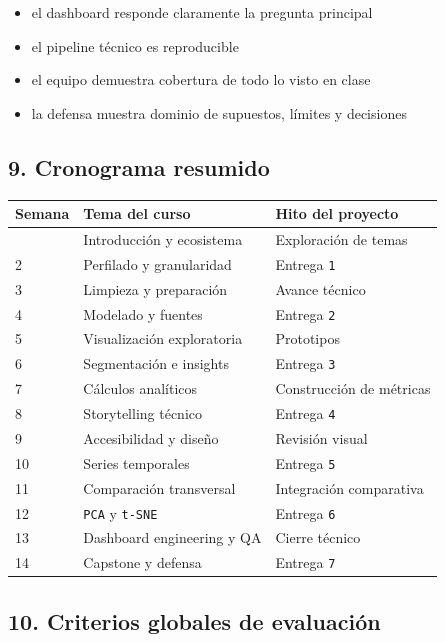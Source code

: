 \documentclass[
]{article}
\providecommand{\tightlist}{%
  \setlength{\itemsep}{0pt}\setlength{\parskip}{0pt}}
\begin{document}
\begin{itemize}
\tightlist
\item
  el dashboard responde claramente la pregunta principal
\item
  el pipeline técnico es reproducible
\item
  el equipo demuestra cobertura de todo lo visto en clase
\item
  la defensa muestra dominio de supuestos, límites y decisiones
\end{itemize}

\subsection{9. Cronograma resumido}\label{9-cronograma-resumido}

\begin{longtable}[]{@{}lll@{}}
\toprule\noalign{}
Semana & Tema del curso & Hito del proyecto \\
\midrule\noalign{}
\endhead
\bottomrule\noalign{}
\endlastfoot
1 & Introducción y ecosistema & Exploración de temas \\
2 & Perfilado y granularidad & Entrega \texttt{1} \\
3 & Limpieza y preparación & Avance técnico \\
4 & Modelado y fuentes & Entrega \texttt{2} \\
5 & Visualización exploratoria & Prototipos \\
6 & Segmentación e insights & Entrega \texttt{3} \\
7 & Cálculos analíticos & Construcción de métricas \\
8 & Storytelling técnico & Entrega \texttt{4} \\
9 & Accesibilidad y diseño & Revisión visual \\
10 & Series temporales & Entrega \texttt{5} \\
11 & Comparación transversal & Integración comparativa \\
12 & \texttt{PCA} y \texttt{t-SNE} & Entrega \texttt{6} \\
13 & Dashboard engineering y QA & Cierre técnico \\
14 & Capstone y defensa & Entrega \texttt{7} \\
\end{longtable}

\subsection{10. Criterios globales de
evaluación}\label{10-criterios-globales-de-evaluaciuxf3n}
\end{document}
